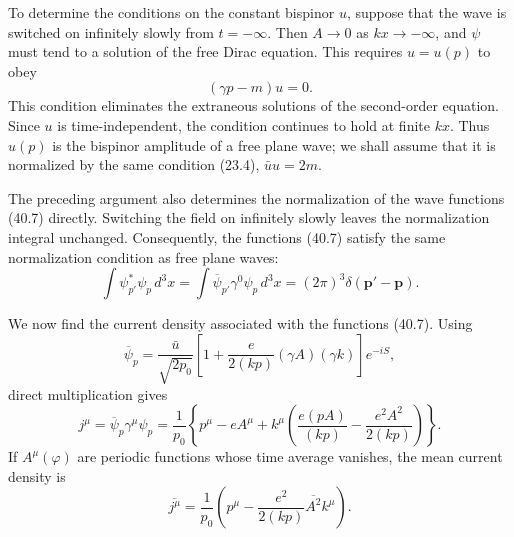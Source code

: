 To determine the conditions on the constant bispinor $u$, suppose that the wave is switched on infinitely slowly from $t=-\infty$. Then $A\to0$ as $kx\to-\infty$, and $\psi$ must tend to a solution of the free Dirac equation. This requires $u=u(p)$ to obey
\begin{equation}
(\gamma p-m)u=0.
\tag{40.9}
\end{equation}
This condition eliminates the extraneous solutions of the second-order equation. Since $u$ is time-independent, the condition continues to hold at finite $kx$. Thus $u(p)$ is the bispinor amplitude of a free plane wave; we shall assume that it is normalized by the same condition (23.4), $\bar uu=2m$.

The preceding argument also determines the normalization of the wave functions (40.7) directly. Switching the field on infinitely slowly leaves the normalization integral unchanged. Consequently, the functions (40.7) satisfy the same normalization condition as free plane waves:
\begin{equation}
\int\psi_{p'}^*\psi_p\,d^3x
=\int\overline{\psi}_{p'}\gamma^0\psi_p\,d^3x
=(2\pi)^3\delta(\mathbf p'-\mathbf p).
\tag{40.10}
\end{equation}

We now find the current density associated with the functions (40.7). Using
\[
\overline{\psi}_p=\frac{\bar u}{\sqrt{2p_0}}
\left[1+\frac e{2(kp)}(\gamma A)(\gamma k)\right]e^{-iS},
\]
direct multiplication gives
\begin{equation}
j^\mu=\overline{\psi}_p\gamma^\mu\psi_p
=\frac1{p_0}\left\{p^\mu-eA^\mu+k^\mu
\left(\frac{e(pA)}{(kp)}-\frac{e^2A^2}{2(kp)}\right)\right\}.
\tag{40.11}
\end{equation}
If $A^\mu(\varphi)$ are periodic functions whose time average vanishes, the mean current density is
\begin{equation}
\overline{j^\mu}=\frac1{p_0}
\left(p^\mu-\frac{e^2}{2(kp)}\overline{A^2}k^\mu\right).
\tag{40.12}
\end{equation}

